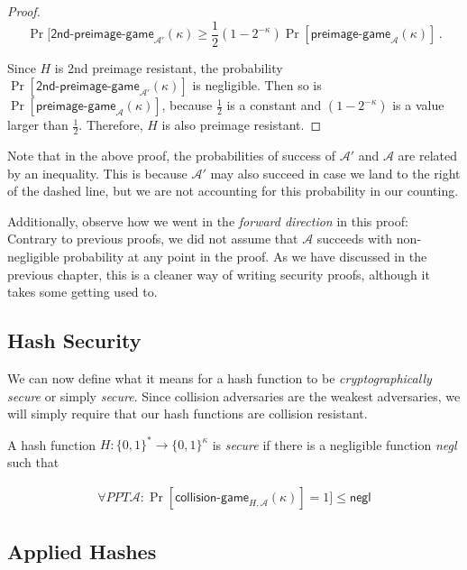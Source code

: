 \begin{proof}
  \[
    \Pr[\textsf{2nd-preimage-game}_{\mathcal{A}'}(\kappa) \geq \frac{1}{2} (1 - 2^{-\kappa}) \Pr[\textsf{preimage-game}_\mathcal{A}(\kappa)]\,.
  \]

  Since $H$ is 2nd preimage resistant, the probability $\Pr[\textsf{2nd-preimage-game}_{\mathcal{A}'}(\kappa)]$ is negligible.
  Then so is $\Pr[\textsf{preimage-game}_\mathcal{A}(\kappa)]$, because $\frac{1}{2}$ is a constant and $(1 - 2^{-\kappa})$ is a value larger than $\frac{1}{2}$. Therefore, $H$ is also preimage resistant.
\end{proof}

Note that in the above proof, the probabilities of success of $\mathcal{A}'$
and $\mathcal{A}$ are related by an inequality. This is because $\mathcal{A}'$
may also succeed in case we land to the right of the dashed line, but we are not
accounting for this probability in our counting.

Additionally, observe how we went in the \emph{forward direction} in this proof:
Contrary to previous proofs, we did not assume that $\mathcal{A}$ succeeds with non-negligible
probability at any point in the proof. As we have discussed in the previous chapter,
this is a cleaner way of writing security proofs, although it takes some getting used to.

\subsection*{Hash Security}

We can now define what it means for a hash function to be \emph{cryptographically secure}
or simply \emph{secure}. Since collision adversaries are the weakest adversaries, we will
simply require that our hash functions are collision resistant.

\begin{definition}
  A hash function $H: \{0, 1\}^* \longrightarrow \{0, 1\}^\kappa$ is \emph{secure} if there is a negligible function \emph{negl} such that

  \begin{gather*}
    \forall PPT \mathcal{A}:
      \Pr[\textsf{collision-game}_{H,\mathcal{A}}(\kappa)] = 1] \leq \textsf{negl}
  \end{gather*}
\end{definition}

\subsection*{Applied Hashes}

